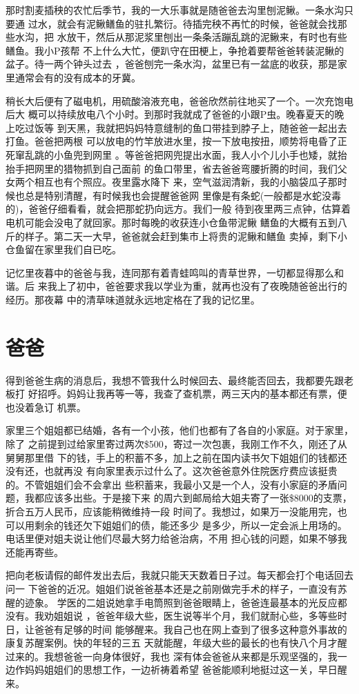 \documentclass[12pt]{book}
\begin{document}
那时割麦插秧的农忙后季节，我的一大乐事就是随爸爸去沟里刨泥鳅。一条水沟只要通
过水，就会有泥鳅鳝鱼的驻扎繁衍。待插完秧不再忙的时候，爸爸就会找那些水沟，把
水放干，然后从那泥浆里刨出一条条活蹦乱跳的泥鳅来，有时也有些鳝鱼。我小P孩帮
不上什么大忙，便趴守在田梗上，争抢着要帮爸爸转装泥鳅的盆子。待一两个钟头过去
，爸爸刨完一条水沟，盆里已有一盆底的收获，那是家里通常会有的没有成本的牙冀。

稍长大后便有了磁电机，用硫酸溶液充电，爸爸欣然前往地买了一个。一次充饱电后大
概可以持续放电八个小时。到那时我就成了爸爸的小跟P虫。晚春夏天的晚上吃过饭等
到天黑，我就把妈妈特意缝制的鱼口带挂到脖子上，随爸爸一起出去打鱼。爸爸把两根
可以放电的竹竿放进水里，按一下放电按扭，顺势将电昏了正死窜乱跳的小鱼兜到网里
。等爸爸把网兜提出水面，我人小个儿小手也矮，就抬抬手把网里的猎物抓到自己面前
的鱼口带里，省去爸爸弯腰折腾的时间，我们父女两个相互也有个照应。夜里露水降下
来，空气滋润清新，我的小脑袋瓜子那时候也总是特别清醒，有时候我也会提醒爸爸网
里像是有条蛇(一般都是水蛇没毒的)，爸爸仔细看看，就会把那蛇扔向远方。我们一般
待到夜里两三点钟，估算着电机可能会没电了就回家。那时每晚的收获连小仓鱼带泥鳅
鳝鱼的大概有五到八斤的样子。第二天一大早，爸爸就会赶到集市上将贵的泥鳅和鳝鱼
卖掉，剩下小仓鱼留在家里我们自已吃。

记忆里夜暮中的爸爸与我，连同那有着青蛙鸣叫的青草世界，一切都显得那么和谐。后
来我上了初中，爸爸要求我以学业为重，就再也没有了夜晚随爸爸出行的经历。那夜幕
中的清草味道就永远地定格在了我的记忆里。
\section{爸爸}
\label{sec-9-7}

得到爸爸生病的消息后，我想不管我什么时候回去、最终能否回去，我都要先跟老板打
好招呼。妈妈让我再等一等，我查了查机票，两三天内的基本都还有票，便也没着急订
机票。

家里三个姐姐都已结婚，各有一个小孩，他们也都有了各自的小家庭。对于家里，除了
之前提到过给家里寄过两次\$500，寄过一次包裹，我刚工作不久，刚还了从舅舅那里借
下的钱，手上的积蓄不多，加上之前在国内读书欠下姐姐们的钱都还没有还，也就再没
有向家里表示过什么了。这次爸爸意外住院医疗费应该挺贵的。不管姐姐们会不会拿出
些积蓄来，我最小又是一个人，没有小家庭的矛盾问题，我都应该多出些。于是接下来
的周六到邮局给大姐夫寄了一张\$8000的支票，折合五万人民币，应该能稍微维持一段
时间了。我想过，如果万一没能用完，也可以用剩余的钱还欠下姐姐们的债，能还多少
是多少，所以一定会派上用场的。电话里便对姐夫说让他们尽最大努力给爸治病，不用
担心钱的问题，如果不够我还能再寄些。

把向老板请假的邮件发出去后，我就只能天天数着日子过。每天都会打个电话回去问一
下爸爸的近况。姐姐们说爸爸基本还是之前刚做完手术的样子，一直没有苏醒的迹象。
学医的二姐说她拿手电筒照到爸爸眼睛上，爸爸连最基本的光反应都没有。我劝姐姐说
，爸爸年级大些，医生说等半个月，我们就耐心些，多等些时日，让爸爸有足够的时间
能够醒来。我自己也在网上查到了很多这种意外事故的康复苏醒案例。快的年轻的三五
天就能醒，年级大些的最长的也有快八个月才醒过来的。我想爸爸一向身体很好，我也
深有体会爸爸从来都是乐观坚强的，我一边作妈妈姐姐们的思想工作，一边祈祷着希望
爸爸能顺利地挺过这一关，早日醒来。
\end{document}
